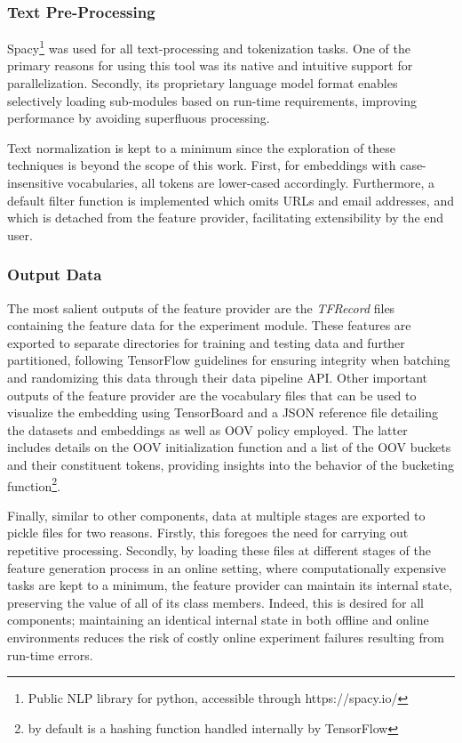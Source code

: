 \documentclass[12pt, a4paper]{report}
\theoremstyle{definition}
\theoremstyle{definition}%
\theoremstyle{definition}%
\theoremstyle{definition}%
\theoremstyle{definition}%
\theoremstyle{definition}%
\begin{document}
\subsubsection{Text Pre-Processing}
Spacy\footnote{Public NLP library for python, accessible through https://spacy.io/} was used for all text-processing and tokenization tasks. One of the primary reasons for using this tool was its native and intuitive support for parallelization. Secondly, its proprietary language model format enables selectively loading sub-modules based on run-time requirements, improving performance by avoiding superfluous processing.

Text normalization is kept to a minimum since the exploration of these techniques is beyond the scope of this work. First, for embeddings with case-insensitive vocabularies, all tokens are lower-cased accordingly. Furthermore, a default filter function is implemented which omits URLs and email addresses, and which is detached from the feature provider, facilitating extensibility by the end user.

\subsubsection{Output Data}
The most salient outputs of the feature provider are the \textit{TFRecord} files containing the feature data for the experiment module. These features are exported to separate directories for training and testing data and further partitioned, following TensorFlow guidelines for ensuring integrity when batching and randomizing this data through their data pipeline API. Other important outputs of the feature provider are the vocabulary files that can be used to visualize the embedding using TensorBoard and a JSON reference file detailing the datasets and embeddings as well as OOV policy employed. The latter includes details on the OOV initialization function and a list of the OOV buckets and their constituent tokens, providing insights into the behavior of the bucketing function\footnote{by default is a hashing function handled internally by TensorFlow}.

Finally, similar to other components, data at multiple stages are exported to pickle files for two reasons. Firstly, this foregoes the need for carrying out repetitive processing. Secondly, by loading these files at different stages of the feature generation process in an online setting, where computationally expensive tasks are kept to a minimum, the feature provider can maintain its internal state, preserving the value of all of its class members. Indeed, this is desired for all components; maintaining an identical internal state in both offline and online environments reduces the risk of costly online experiment failures resulting from run-time errors.
\end{document}
